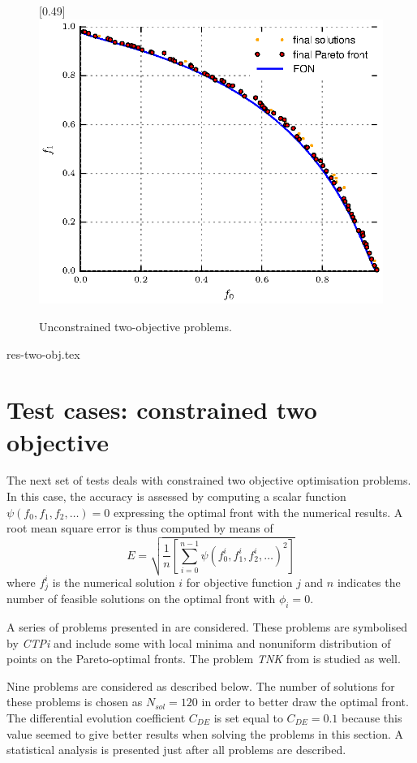 \documentclass[final,5p,times,twocolumn]{elsarticle}
\begin{document}
\begin{figure}
[0.49\linewidth]{\includegraphics[width=0.45\linewidth]{./figs/res/FON.eps}}
\caption{Unconstrained two-objective problems.}%
\label{fig:two-obj}
\end{figure}

{res-two-obj.tex}



\section{Test cases: constrained two objective}
\label{sec:twoObj}

The next set of tests deals with constrained two objective optimisation problems. In this case, the
accuracy is assessed by computing a scalar function $\psi(f_0,f_1,f_2,\ldots)=0$ expressing the
optimal front with the numerical results. A root mean square error is thus computed by means of
\begin{equation}
E = \sqrt{ \frac{1}{n} \left[ \sum_{i=0}^{n-1} \psi(f_0^i,f_1^i,f_2^i,\ldots)^2 \right] }
\end{equation}
where $f_j^i$ is the numerical solution $i$ for objective function $j$ and $n$ indicates the number
of feasible solutions on the optimal front with $\phi_i=0$.

A series of problems presented in \citep{deb:01a} are considered. These problems are symbolised by
\emph{CTPi} and include some with local minima and nonuniform distribution of points on the
Pareto-optimal fronts. The problem \emph{TNK} from \citep{tanaka:95} is studied as well.

Nine problems are considered as described below. The number of solutions for these problems is
chosen as $N_{sol}=120$ in order to better draw the optimal front. The differential evolution
coefficient $C_{DE}$ is set equal to $C_{DE}=0.1$ because this value seemed to give better results
when solving the problems in this section. A statistical analysis is presented just after all
problems are described.
\end{document}
